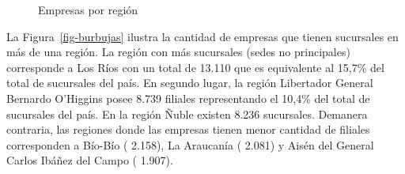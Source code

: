 \documentclass[
  11pt,
]{article}
\begin{document}
\begin{figure}[H]

\caption{\label{fig-mapa}Empresas por región}


\end{figure}%

\newpage

La Figura~\ref{fig-burbujas} ilustra la cantidad de empresas que tienen
sucursales en más de una región. La región con más sucursales (sedes no
principales) corresponde a Los Ríos con un total de 13.110 que es
equivalente al 15,7\% del total de sucursales del país. En segundo
lugar, la región Libertador General Bernardo O'Higgins posee 8.739
filiales representando el 10,4\% del total de sucursales del país. En la
región Ñuble existen 8.236 sucursales. Demanera contraria, las regiones
donde las empresas tienen menor cantidad de filiales corresponden a
Bío-Bío ( 2.158), La Araucanía ( 2.081) y Aisén del General Carlos
Ibáñez del Campo ( 1.907).
\end{document}
